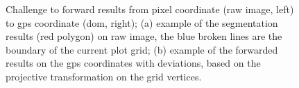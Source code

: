 \begin{figure}[htb!]
  \begin{center}
  \end{center}
  \caption[Challenge to forward results from pixel coordinate to GPS coordinate]{
    Challenge to forward results from pixel coordinate (raw image, left) to \gls{gps} coordinate (\gls{dom}, right); (a) example of the segmentation results (red polygon) on raw image, the blue broken lines are the boundary of the current plot grid; (b) example of the forwarded results on the \gls{gps} coordinates with deviations, based on the projective transformation on the grid vertices.
  }
  \label{fig:xrs1}
\end{figure}